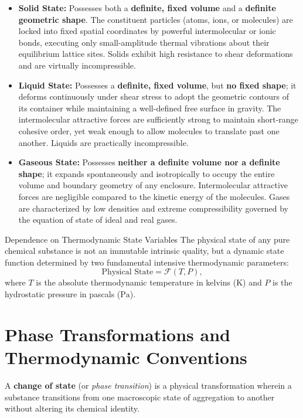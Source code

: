 \begin{itemize}[leftmargin=1.5em,itemsep=4pt]
  \item \textbf{Solid State:} Possesses both a \textbf{definite, fixed volume} and a \textbf{definite geometric shape}. The constituent particles (atoms, ions, or molecules) are locked into fixed spatial coordinates by powerful intermolecular or ionic bonds, executing only small-amplitude thermal vibrations about their equilibrium lattice sites. Solids exhibit high resistance to shear deformations and are virtually incompressible.
  \item \textbf{Liquid State:} Possesses a \textbf{definite, fixed volume}, but \textbf{no fixed shape}; it deforms continuously under shear stress to adopt the geometric contours of its container while maintaining a well-defined free surface in gravity. The intermolecular attractive forces are sufficiently strong to maintain short-range cohesive order, yet weak enough to allow molecules to translate past one another. Liquids are practically incompressible.
  \item \textbf{Gaseous State:} Possesses \textbf{neither a definite volume nor a definite shape}; it expands spontaneously and isotropically to occupy the entire volume and boundary geometry of any enclosure. Intermolecular attractive forces are negligible compared to the kinetic energy of the molecules. Gases are characterized by low densities and extreme compressibility governed by the equation of state of ideal and real gases.
\end{itemize}

\begin{lawbox}{Dependence on Thermodynamic State Variables}
The physical state of any pure chemical substance is not an immutable intrinsic quality, but a dynamic state function determined by two fundamental intensive thermodynamic parameters:
\begin{equation}
\text{Physical State} = \mathcal{F}(T, P),
\end{equation}
where $T$ is the absolute thermodynamic temperature in kelvins ($\mathrm{K}$) and $P$ is the hydrostatic pressure in pascals ($\mathrm{Pa}$).
\end{lawbox}

\section{Phase Transformations and Thermodynamic Conventions}

A \textbf{change of state} (or \emph{phase transition}) is a physical transformation wherein a substance transitions from one macroscopic state of aggregation to another without altering its chemical identity.

